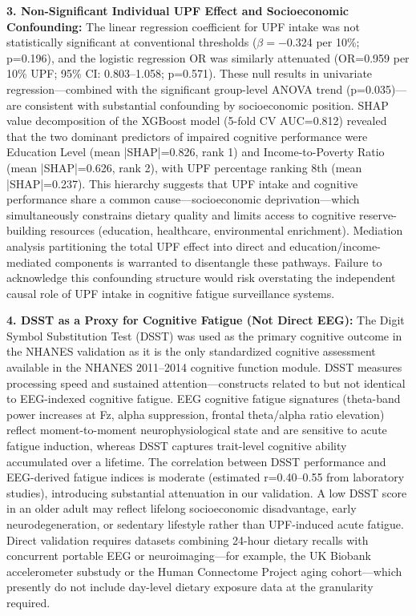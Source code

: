 \documentclass[journal,twoside,10pt]{IEEEtran}
\begin{document}
\textbf{3. Non-Significant Individual UPF Effect and Socioeconomic Confounding:}
The linear regression coefficient for UPF intake was not statistically significant at conventional thresholds ($\beta=$$-$0.324 per 10\%; p=0.196), and the logistic regression OR was similarly attenuated (OR=0.959 per 10\% UPF; 95\% CI: 0.803--1.058; p=0.571). These null results in univariate regression---combined with the significant group-level ANOVA trend (p=0.035)---are consistent with substantial confounding by socioeconomic position. SHAP value decomposition of the XGBoost model (5-fold CV AUC=0.812) revealed that the two dominant predictors of impaired cognitive performance were Education Level (mean |SHAP|=0.826, rank 1) and Income-to-Poverty Ratio (mean |SHAP|=0.626, rank 2), with UPF percentage ranking 8th (mean |SHAP|=0.237). This hierarchy suggests that UPF intake and cognitive performance share a common cause---socioeconomic deprivation---which simultaneously constrains dietary quality and limits access to cognitive reserve-building resources (education, healthcare, environmental enrichment). Mediation analysis partitioning the total UPF effect into direct and education/income-mediated components is warranted to disentangle these pathways. Failure to acknowledge this confounding structure would risk overstating the independent causal role of UPF intake in cognitive fatigue surveillance systems.

\textbf{4. DSST as a Proxy for Cognitive Fatigue (Not Direct EEG):}
The Digit Symbol Substitution Test (DSST) was used as the primary cognitive outcome in the NHANES validation as it is the only standardized cognitive assessment available in the NHANES 2011--2014 cognitive function module. DSST measures processing speed and sustained attention---constructs related to but not identical to EEG-indexed cognitive fatigue. EEG cognitive fatigue signatures (theta-band power increases at Fz, alpha suppression, frontal theta/alpha ratio elevation) reflect moment-to-moment neurophysiological state and are sensitive to acute fatigue induction, whereas DSST captures trait-level cognitive ability accumulated over a lifetime. The correlation between DSST performance and EEG-derived fatigue indices is moderate (estimated r=0.40--0.55 from laboratory studies), introducing substantial attenuation in our validation. A low DSST score in an older adult may reflect lifelong socioeconomic disadvantage, early neurodegeneration, or sedentary lifestyle rather than UPF-induced acute fatigue. Direct validation requires datasets combining 24-hour dietary recalls with concurrent portable EEG or neuroimaging---for example, the UK Biobank accelerometer substudy or the Human Connectome Project aging cohort---which presently do not include day-level dietary exposure data at the granularity required.
\end{document}
